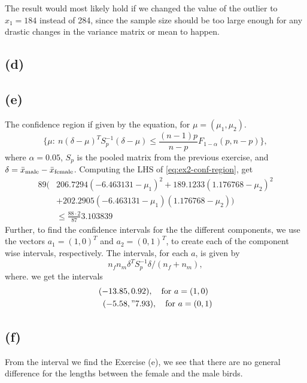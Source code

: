 The result would most likely hold if we changed the value of the
outlier to $x_1 = 184$ instead of 284, since the sample size should be too
large enough for any drastic changes in the variance matrix or mean to
happen.

\subsection*{(d)}

\subsection*{(e)}
\label{sec:e}

The confidence region if given by the equation, for $\mu = (\mu_1, \mu_2).$
\begin{equation}
  \label{eq:ex2-conf-region}
 \{\mu:\ n (\delta - \mu)^T S_p^{-1} (\delta-\mu)\leq \frac{(n-1)p}{n-p}F_{1-\alpha}(p,n-p)\},
\end{equation}
where $\alpha = 0.05$, $S_p$ is the pooled matrix from the previous
exercise, and $\delta = \bar{x}_{\rm male}  - \bar{x}_{\rm
  female}$. Computing the LHS of \eqref{eq:ex2-conf-region}, get
\begin{align*}
  89
  \big(
    &206.7294 ( - 6.463131 -\mu_1)^2 + 189.1233(1.176768 -\mu_2)^2 \\
    &+ 202.2905(- 6.463131 - \mu_1)(1.176768- \mu_2)
  \big)\\
  &\leq \frac{88\cdot 2}{87}3.103839
\end{align*}
Further, to find the confidence intervals for the the different
components, we use the vectors $a_1 = (1,0)^T$ and $a_2 = (0,1)^T$, to
create each of the component wise intervals, respectively. The
intervals, for each $a$, is given by 
\begin{equation*}
  n_f n_m \delta^T S_p^{-1} \delta / (n_f + n_m) , 
\end{equation*}
where.
we get the intervals
\begin{align*}
  (-13.85&, 0.92), \quad \text{for } a = (1,0)
  \\
  (-5.58&, "7.93), \quad \text{for } a = (0,1)
\end{align*}

\subsection*{(f)}
\label{sec:f}

From the interval we find the Exercise (e), we see that there are no
general difference for the lengths between the female and the male birds.



